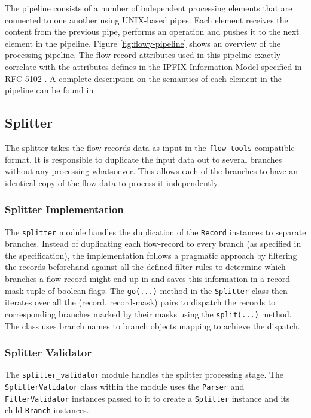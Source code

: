 The pipeline consists of a number of independent processing elements that are connected to one another using UNIX-based pipes. Each element receives the content from the previous pipe, performs an operation and pushes it to the next element in the pipeline. Figure \ref{fig:flowy-pipeline} shows an overview of the processing pipeline. The flow record attributes used in this pipeline exactly correlate with the attributes defines in the \ac{IPFIX} Information Model specified in RFC 5102 \cite{rfc5102}. A complete description on the semantics of each element in the pipeline can be found in \cite{vmarinov:thesis:2009}

\subsection{Splitter}\label{subsec:splitter}
The splitter takes the flow-records data as input in the \texttt{flow-tools} compatible format. It is responsible to duplicate the input data out to several branches without any processing whatsoever. This allows each of the branches to have an identical copy of the flow data to process it independently.

\subsubsection{Splitter Implementation}\label{subsubsec:splitter-impl}
The \texttt{splitter} module handles the duplication of the \texttt{Record} instances to separate branches. Instead of duplicating each flow-record to every branch (as specified in the specification), the implementation follows a pragmatic approach by filtering the records beforehand against all the defined filter rules to determine which branches a flow-record might end up in and saves this information in a record-mask tuple of boolean flags. The \texttt{go(...)} method in the \texttt{Splitter} class then iterates over all the (record, record-mask) pairs to dispatch the records to corresponding branches marked by their masks using the \texttt{split(...)} method. The class uses branch names to branch objects mapping to achieve the dispatch.

\subsubsection{Splitter Validator}\label{subsubsec:splitter-validator}
The \texttt{splitter\_validator} module handles the splitter processing stage.
The \texttt{SplitterValidator} class within the module uses the \texttt{Parser} and \texttt{FilterValidator} instances passed to it to create a \texttt{Splitter} instance and its child \texttt{Branch} instances.

